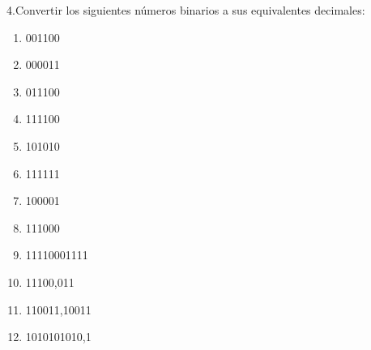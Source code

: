\documentclass[a4paper,12pt]{article}
\begin{document}
	4.Convertir los siguientes números binarios a sus equivalentes decimales:
	\begin{enumerate}
		\item 001100 
		\item 000011 
		\item 011100 
		\item 111100 
		\item 101010 
		\item 111111 
		\item 100001 
		\item 111000 
		\item 11110001111 
		\item 11100,011 
		\item 110011,10011 
		\item 1010101010,1
	\end{enumerate}
	
\end{document}
